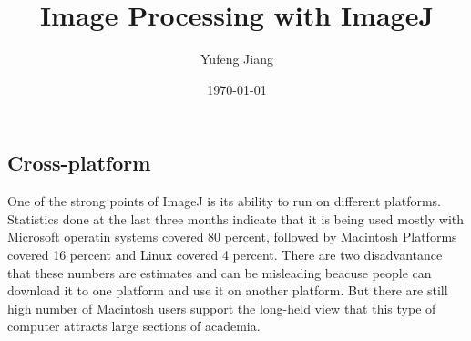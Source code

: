 \documentclass[a4paper]{article}
\title{Image Processing with ImageJ}
\author{Yufeng Jiang}
\date{\today}
\begin{document}
\maketitle
\balance
\begin{multicols}{2}
\section{Cross-platform}
One of the strong points of ImageJ is its ability to run on different platforms. Statistics done at the last three months indicate that it is being used mostly with Microsoft operatin systems covered 80 percent, followed by Macintosh Platforms covered 16 percent and Linux covered 4 percent. There are two disadvantance that these numbers are estimates and can be misleading beacuse people can download it to one platform and use it on another platform. But there are still high number of Macintosh users support the long-held view that this type of computer attracts large sections of academia.\\

\end{multicols}
\end{document}
